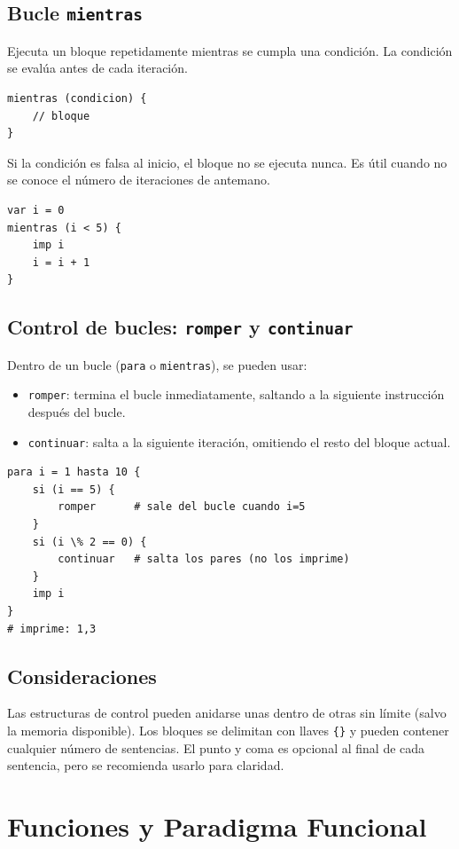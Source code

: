 \documentclass[12pt]{article}
\begin{document}
\subsection{Bucle \texttt{mientras}}
Ejecuta un bloque repetidamente mientras se cumpla una condición. La condición se evalúa antes de cada iteración.
\begin{lstlisting}
mientras (condicion) {
    // bloque
}
\end{lstlisting}
Si la condición es falsa al inicio, el bloque no se ejecuta nunca. Es útil cuando no se conoce el número de iteraciones de antemano.
\begin{lstlisting}
var i = 0
mientras (i < 5) {
    imp i
    i = i + 1
}
\end{lstlisting}

\subsection{Control de bucles: \texttt{romper} y \texttt{continuar}}
Dentro de un bucle (\texttt{para} o \texttt{mientras}), se pueden usar:
\begin{itemize}
    \item \texttt{romper}: termina el bucle inmediatamente, saltando a la siguiente instrucción después del bucle.
    \item \texttt{continuar}: salta a la siguiente iteración, omitiendo el resto del bloque actual.
\end{itemize}
\begin{lstlisting}
para i = 1 hasta 10 {
    si (i == 5) {
        romper      # sale del bucle cuando i=5
    }
    si (i \% 2 == 0) {
        continuar   # salta los pares (no los imprime)
    }
    imp i
}
# imprime: 1,3
\end{lstlisting}

\subsection{Consideraciones}
Las estructuras de control pueden anidarse unas dentro de otras sin límite (salvo la memoria disponible). Los bloques se delimitan con llaves \texttt{\{\}} y pueden contener cualquier número de sentencias. El punto y coma es opcional al final de cada sentencia, pero se recomienda usarlo para claridad.


\section{Funciones y Paradigma Funcional}
\end{document}
